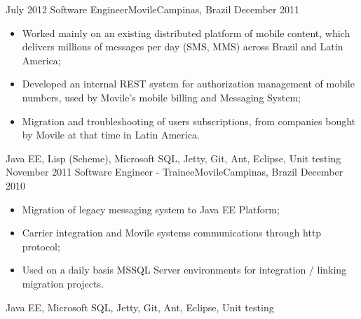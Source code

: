 \begin{experiences}
  \experience
    {July 2012}     {Software Engineer}{Movile}{Campinas, Brazil}
    {December 2011}    {
          \begin{itemize}
            \item Worked mainly on an existing distributed platform of mobile content, which delivers millions of
            messages per day (SMS, MMS) across Brazil and Latin America;
            \item Developed an internal REST system for authorization management of mobile numbers,
             used by Movile's mobile billing and Messaging System;
            \item Migration and troubleshooting of users subscriptions, from companies bought by Movile at that time in Latin America.\\
          \end{itemize}
        }{Java EE, Lisp (Scheme), Microsoft SQL, Jetty, Git, Ant, Eclipse, Unit testing}
  \emptySeparator
  \experience
  {November 2011}       {Software Engineer - Trainee}{Movile}{Campinas, Brazil}
  {December 2010}
        {
          \begin{itemize}
            \item Migration of legacy messaging system to Java EE Platform;
            \item Carrier integration and Movile systems communications through http protocol;
            \item Used on a daily basis MSSQL Server environments for integration / linking migration projects.\\
          \end{itemize}
        }{Java EE, Microsoft SQL, Jetty, Git, Ant, Eclipse, Unit testing}
\end{experiences}
